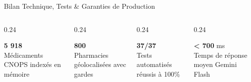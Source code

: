 \documentclass[aspectratio=169,10pt]{beamer}
\begin{document}
\begin{frame}{Bilan Technique, Tests \& Garanties de Production}
    \begin{columns}[T]
        \begin{column}{0.24\textwidth}
            \begin{tcolorbox}[colback=primary!10,colframe=primary,arc=2mm,center,title={\footnotesize \textbf{Catalogue}}]
                \centering \Huge \textbf{5 918} \\[1mm]
                \scriptsize Médicaments CNOPS indexés en mémoire
            \end{tcolorbox}
        \end{column}

        \begin{column}{0.24\textwidth}
            \begin{tcolorbox}[colback=secondary!10,colframe=secondary,arc=2mm,center,title={\footnotesize \textbf{Officines}}]
                \centering \Huge \textbf{800} \\[1mm]
                \scriptsize Pharmacies géolocalisées avec gardes
            \end{tcolorbox}
        \end{column}

        \begin{column}{0.24\textwidth}
            \begin{tcolorbox}[colback=success!10,colframe=success!80!black,arc=2mm,center,title={\footnotesize \textbf{Tests CI/CD}}]
                \centering \Huge \textbf{37/37} \\[1mm]
                \scriptsize Tests automatisés réussis à 100\%
            \end{tcolorbox}
        \end{column}

        \begin{column}{0.24\textwidth}
            \begin{tcolorbox}[colback=accent!10,colframe=accent,arc=2mm,center,title={\footnotesize \textbf{Latence}}]
                \centering \Huge \textbf{< 700} \normalsize ms\\[1mm]
                \scriptsize Temps de réponse moyen Gemini Flash
            \end{tcolorbox}
        \end{column}
    \end{columns}


\end{frame}
\end{document}
